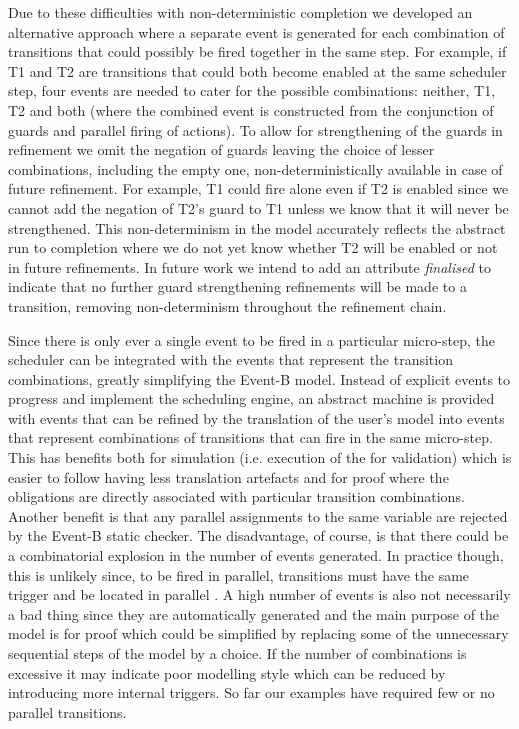 Due to these difficulties with non-deterministic completion we developed an alternative approach where a separate event is generated for each combination of transitions that could possibly be fired together in the same step. 
For example, if T1 and T2 are transitions that could both become enabled at the same scheduler step, four events are needed to cater for the possible combinations: neither, T1, T2 and both (where the combined event is constructed from the conjunction of guards and parallel firing of actions). 
To allow for strengthening of the guards  in refinement we omit the negation of guards
leaving the choice of lesser combinations, including the empty one, non-deterministically available in case of future refinement.
For example, T1 could fire alone even if T2 is enabled since we cannot add the negation of T2's guard to T1 unless we know that it will never be strengthened. 
This non-determinism in the model accurately reflects the abstract run to completion where we do not yet know whether T2 will be enabled or not in future refinements.
In future work we intend to add an attribute \emph{finalised} to indicate that no further guard strengthening refinements will be made to a transition, removing non-determinism throughout the refinement chain.


Since there is only ever a single event to be fired in a particular micro-step, the scheduler can be integrated with the events that represent the transition combinations, greatly simplifying the Event-B model.
Instead of explicit events to progress and implement the scheduling engine, an abstract machine is provided with events that can be refined by the translation of the user's \SCXML model into events that represent combinations of transitions that can fire in the same micro-step.
This has benefits both for simulation (i.e. execution of the \statechart for validation) which is easier to follow having less translation artefacts and for proof where the obligations are directly associated with particular transition combinations. 
Another benefit is that any parallel assignments to the same variable are rejected by the Event-B static checker.
The disadvantage, of course, is that there could be a combinatorial explosion in the number of events generated.
In practice though, this is unlikely since, to be fired in parallel, transitions must have the same trigger and be located in parallel \statecharts.
A high number of events is also not necessarily a bad thing since they are automatically generated and the main purpose of the \EventB model is for proof which could be simplified by replacing some of the unnecessary sequential steps of the model by a choice.
If the number of combinations is excessive it may indicate poor modelling style which can be reduced by introducing more internal triggers.
So far our examples have required few or no parallel transitions.

